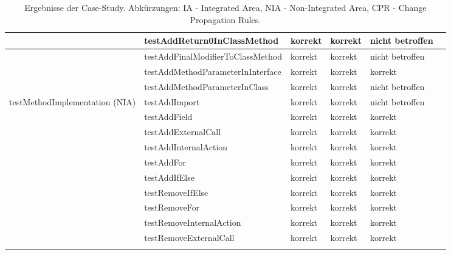 \begin{tiny}
\begin{longtable}[c]{|p{2.2cm}|p{3.5cm}|p{1cm}|p{1cm}|p{1cm}|p{4cm}|}
 & testAddReturn0InClassMethod & korrekt & korrekt & nicht 			betroffen &  \\ \hline
 & testAddFinalModifierToClassMethod & korrekt & korrekt & nicht 			betroffen &  \\ \hline
 & testAddMethodParameterInInterface & korrekt & korrekt & korrekt &  \\ \hline
 & testAddMethodParameterInClass & korrekt & korrekt & nicht 			betroffen &  \\ \hline
testMethodImplementation 			(NIA) & testAddImport & korrekt & korrekt & nicht betroffen &  \\ \hline
 & testAddField & korrekt & korrekt & korrekt &  \\ \hline
 & testAddExternalCall & korrekt & korrekt & korrekt &  \\ \hline
 & testAddInternalAction & korrekt & korrekt & korrekt &  \\ \hline
 & testAddFor & korrekt & korrekt & korrekt &  \\ \hline
 & testAddIfElse & korrekt & korrekt & korrekt &  \\ \hline
 & testRemoveIfElse & korrekt & korrekt & korrekt &  \\ \hline
 & testRemoveFor & korrekt & korrekt & korrekt &  \\ \hline
 & testRemoveInternalAction & korrekt & korrekt & korrekt &  \\ \hline
 & testRemoveExternalCall & korrekt & korrekt & korrekt &  \\ \hline
\caption{Ergebnisse der Case-Study. Abkürzungen: IA - Integrated Area, NIA - Non-Integrated Area, CPR - Change Propagation Rules.}
\label{tab:casestudy}\\
\end{longtable}

 
\end{tiny} 
 
